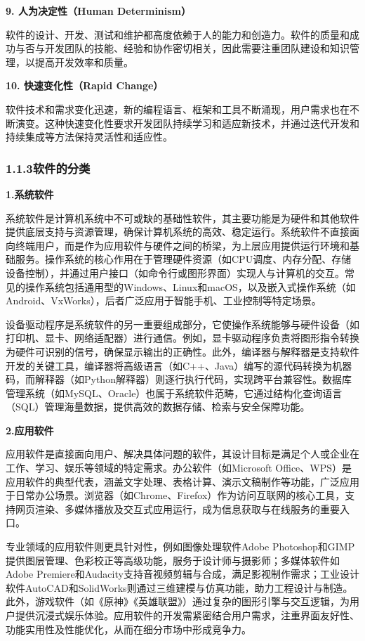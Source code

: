 \textbf{9. 人为决定性（Human Determinism）}

软件的设计、开发、测试和维护都高度依赖于人的能力和创造力。软件的质量和成功与否与开发团队的技能、经验和协作密切相关，因此需要注重团队建设和知识管理，以提高开发效率和质量。

\textbf{10. 快速变化性（Rapid Change）}

软件技术和需求变化迅速，新的编程语言、框架和工具不断涌现，用户需求也在不断演变。这种快速变化性要求开发团队持续学习和适应新技术，并通过迭代开发和持续集成等方法保持灵活性和适应性。

\subsubsection{1.1.3软件的分类}\label{ux8f6fux4ef6ux7684ux5206ux7c7b}

\textbf{1.系统软件}

系统软件是计算机系统中不可或缺的基础性软件，其主要功能是为硬件和其他软件提供底层支持与资源管理，确保计算机系统的高效、稳定运行。系统软件不直接面向终端用户，而是作为应用软件与硬件之间的桥梁，为上层应用提供运行环境和基础服务。操作系统的核心作用在于管理硬件资源（如CPU调度、内存分配、存储设备控制），并通过用户接口（如命令行或图形界面）实现人与计算机的交互。常见的操作系统包括通用型的Windows、Linux和macOS，以及嵌入式操作系统（如Android、VxWorks），后者广泛应用于智能手机、工业控制等特定场景。

设备驱动程序是系统软件的另一重要组成部分，它使操作系统能够与硬件设备（如打印机、显卡、网络适配器）进行通信。例如，显卡驱动程序负责将图形指令转换为硬件可识别的信号，确保显示输出的正确性。此外，编译器与解释器是支持软件开发的关键工具，编译器将高级语言（如C++、Java）编写的源代码转换为机器码，而解释器（如Python解释器）则逐行执行代码，实现跨平台兼容性。数据库管理系统（如MySQL、Oracle）也属于系统软件范畴，它通过结构化查询语言（SQL）管理海量数据，提供高效的数据存储、检索与安全保障功能。

\textbf{2.应用软件}

应用软件是直接面向用户、解决具体问题的软件，其设计目标是满足个人或企业在工作、学习、娱乐等领域的特定需求。办公软件（如Microsoft Office、WPS）是应用软件的典型代表，涵盖文字处理、表格计算、演示文稿制作等功能，广泛应用于日常办公场景。浏览器（如Chrome、Firefox）作为访问互联网的核心工具，支持网页渲染、多媒体播放及交互式应用运行，成为信息获取与在线服务的重要入口。

专业领域的应用软件则更具针对性，例如图像处理软件Adobe Photoshop和GIMP提供图层管理、色彩校正等高级功能，服务于设计师与摄影师；多媒体软件如Adobe Premiere和Audacity支持音视频剪辑与合成，满足影视制作需求；工业设计软件AutoCAD和SolidWorks则通过三维建模与仿真功能，助力工程设计与制造。此外，游戏软件（如《原神》《英雄联盟》）通过复杂的图形引擎与交互逻辑，为用户提供沉浸式娱乐体验。应用软件的开发需紧密结合用户需求，注重界面友好性、功能实用性及性能优化，从而在细分市场中形成竞争力。

